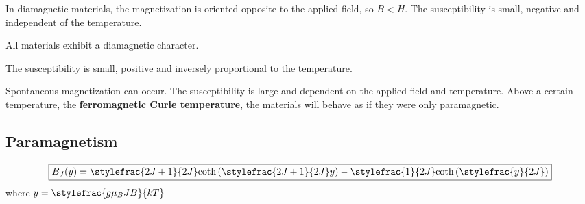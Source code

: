 	\begin{definition}[Diamagnetism]
    		In diamagnetic materials, the magnetization is oriented opposite to the applied field, so $B < H$. The susceptibility is small, negative and independent of the temperature.
	\end{definition}
	\begin{remark}
    		All materials exhibit a diamagnetic character.
	\end{remark}
        
	\begin{definition}[Paramagnetism]
    		The susceptibility is small, positive and inversely proportional to the temperature.
	\end{definition}
        
	\begin{definition}[Ferromagnetism]
    		Spontaneous magnetization can occur. The susceptibility is large and dependent on the applied field and temperature. Above a certain temperature, the \textbf{ferromagnetic Curie temperature}, the materials will behave as if they were only paramagnetic.
	\end{definition}
        
\subsection{Paramagnetism}
	
	
	\begin{formula}
		\begin{equation}
        		\label{magnetism:brillouin_function}
        		\boxed{B_J(y) = \stylefrac{2J + 1}{2J}\text{coth}\left(\stylefrac{2J + 1}{2J}y\right) - \stylefrac{1}{2J}\text{coth}\left(\stylefrac{y}{2J}\right)}
	        \end{equation}
        	where $y = \stylefrac{g\mu_BJB}{kT}$
	\end{formula}

